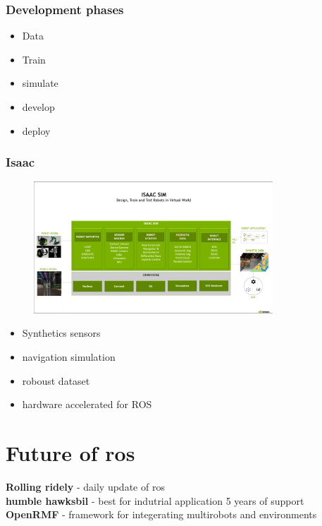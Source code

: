 \documentclass[a4paper]{article}
\begin{document}
\subsubsection{Development phases}
\begin{itemize}
    \item Data
    \item Train
    \item simulate
    \item develop
    \item deploy
\end{itemize}
\subsubsection{Isaac}
\begin{figure}[htpb]
          \centering
          \includegraphics[width=0.8\textwidth]{isaacd.png}
          \caption{}
          \label{fig:}
      \end{figure}
      \begin{itemize}
          \item Synthetics sensors
          \item navigation simulation
          \item roboust dataset
          \item hardware accelerated for ROS
      \end{itemize}
\section{Future of ros}
\textbf{Rolling ridely} - daily update of ros \\
\textbf{humble hawksbil} - best for indutrial application 5 years of support \\
\textbf{OpenRMF} - framework for integerating multirobots and environments
\end{document}
